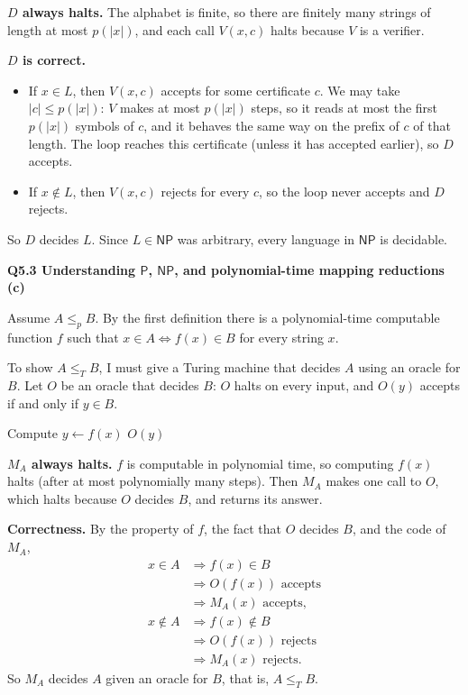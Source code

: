 \documentclass[11pt]{article}
\newcommand{\abs}[1]{\left|#1\right|}
\newcommand{\lT}{\leq_T}
\newcommand{\lp}{\leq_p}
\renewcommand{\P}{\textsf{P}}
\newcommand{\NP}{\textsf{NP}}
\newcommand{\qpage}[1]{\clearpage\noindent\textbf{\large #1}\par\medskip}
\begin{document}
\textbf{$D$ always halts.}
The alphabet is finite, so there are finitely many strings of length at most $p(\abs{x})$, and each call $V(x, c)$ halts because $V$ is a verifier.

\textbf{$D$ is correct.}
\begin{itemize}
  \item If $x \in L$, then $V(x, c)$ accepts for some certificate $c$.
  We may take $\abs{c} \leq p(\abs{x})$: $V$ makes at most $p(\abs{x})$ steps, so it reads at most the first $p(\abs{x})$ symbols of $c$, and it behaves the same way on the prefix of $c$ of that length.
  The loop reaches this certificate (unless it has accepted earlier), so $D$ accepts.
  \item If $x \notin L$, then $V(x, c)$ rejects for every $c$, so the loop never accepts and $D$ rejects.
\end{itemize}

So $D$ decides $L$.
Since $L \in \NP$ was arbitrary, every language in $\NP$ is decidable.

\qpage{Q5.3 Understanding $\P$, $\NP$, and polynomial-time mapping reductions (c)}

Assume $A \lp B$.
By the first definition there is a polynomial-time computable function $f$ such that $x \in A \iff f(x) \in B$ for every string $x$.

To show $A \lT B$, I must give a Turing machine that decides $A$ using an oracle for $B$.
Let $O$ be an oracle that decides $B$: $O$ halts on every input, and $O(y)$ accepts if and only if $y \in B$.

\begin{algorithmic}[1]
    \State Compute $y \gets f(x)$
    \State \Return $O(y)$
  \EndFunction
\end{algorithmic}

\textbf{$M_A$ always halts.}
$f$ is computable in polynomial time, so computing $f(x)$ halts (after at most polynomially many steps).
Then $M_A$ makes one call to $O$, which halts because $O$ decides $B$, and returns its answer.

\textbf{Correctness.}
By the property of $f$, the fact that $O$ decides $B$, and the code of $M_A$,
\begin{align*}
  x \in A &\Longrightarrow f(x) \in B \\
  &\Longrightarrow O(f(x)) \text{ accepts} \\
  &\Longrightarrow M_A(x) \text{ accepts}, \\[0.5em]
  x \notin A &\Longrightarrow f(x) \notin B \\
  &\Longrightarrow O(f(x)) \text{ rejects} \\
  &\Longrightarrow M_A(x) \text{ rejects}.
\end{align*}
So $M_A$ decides $A$ given an oracle for $B$, that is, $A \lT B$.
\end{document}
